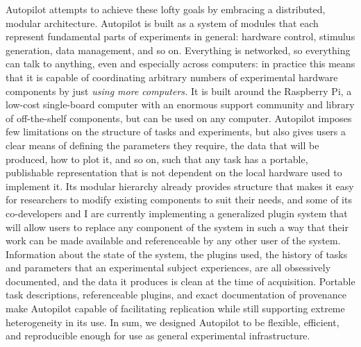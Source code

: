 \documentclass[10pt]{article}
\begin{document}
\begin{multicols}{2}
Autopilot attempts to achieve these lofty goals by embracing a
distributed, modular architecture. Autopilot is built as a system of
modules that each represent fundamental parts of experiments in general:
hardware control, stimulus generation, data management, and so on.
Everything is networked, so everything can talk to anything, even and
especially across computers: in practice this means that it is capable
of coordinating arbitrary numbers of experimental hardware components by
just \emph{using more computers.} It is built around the Raspberry Pi, a
low-cost single-board computer with an enormous support community and
library of off-the-shelf components, but can be used on any computer.
Autopilot imposes few limitations on the structure of tasks and
experiments, but also gives users a clear means of defining the
parameters they require, the data that will be produced, how to plot it,
and so on, such that any task has a portable, publishable representation
that is not dependent on the local hardware used to implement it. Its
modular hierarchy already provides structure that makes it easy for
researchers to modify existing components to suit their needs, and some
of its co-developers and I are currently implementing a generalized
plugin system that will allow users to replace any component of the
system in such a way that their work can be made available and
referenceable by any other user of the system. Information about the
state of the system, the plugins used, the history of tasks and
parameters that an experimental subject experiences, are all obsessively
documented, and the data it produces is clean at the time of
acquisition. Portable task descriptions, referenceable plugins, and
exact documentation of provenance make Autopilot capable of facilitating
replication while still supporting extreme heterogeneity in its use. In
sum, we designed Autopilot to be flexible, efficient, and reproducible
enough for use as general experimental infrastructure.


\end{multicols}
\end{document}
